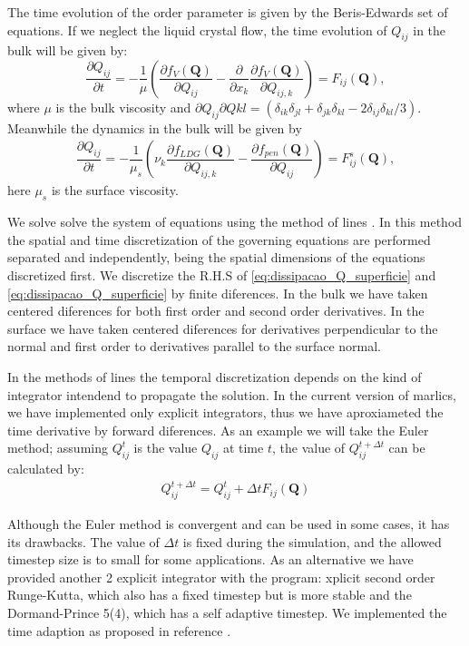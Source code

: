 \documentclass[final,5p,times,twocolumn]{elsarticle}
\begin{document}
The time evolution of the order parameter is given by the
Beris-Edwards set of equations. If we neglect the liquid crystal flow,
the time evolution of $Q_{ij}$ in the bulk will be given by:
\begin{equation} \label{eq:dissipacao_Q}
\dfrac{\partial Q_{ij}}{ \partial t} = -\dfrac{1}{\mu} \left( \dfrac{\partial f_{V}(\mathbf{Q})}{\partial Q_{ij}} - \dfrac{\partial}{\partial x_k } \dfrac{\partial f_V(\mathbf{Q})}{\partial Q_{ij,k}}  \right)=F_{ij}(\mathbf{Q}),
\end{equation}
%
where $\mu$ is the bulk viscosity and $ \partial Q_{ij} \partial Q{kl} = (\delta_{ik} \delta_{jl}+\delta_{jk} \delta_{kl}-2 \delta_{ij} \delta_{kl}/3)$. Meanwhile the dynamics in the bulk will be given by
\begin{align}\label{eq:dissipacao_Q_superficie}
\dfrac{\partial Q_{ij}}{\partial t}=-\dfrac{1}{\mu_s}\left(\nu_k\dfrac{\partial f_{LDG}(\mathbf{Q})}{\partial Q_{ij,k}} -\dfrac{\partial f_{pen}(\mathbf{Q})}{\partial Q_{ij}}\right)=F^s_{ij}(\mathbf{Q}),
\end{align}
here $\mu_s$ is the surface viscosity.

We solve solve the system of equations using the method of lines
\cite{Bhattacharjee2008}. In this method the spatial and time
discretization of the governing equations are performed separated and
independently, being the spatial dimensions of the equations
discretized first.  We discretize the R.H.S of
\eqref{eq:dissipacao_Q_superficie} and
\eqref{eq:dissipacao_Q_superficie} by finite diferences. In the bulk
we have taken centered diferences for both first order and second
order derivatives. In the surface we have taken centered diferences
for derivatives perpendicular to the normal and first order to
derivatives parallel to the surface normal.

In the methods of lines the temporal discretization depends on the
kind of integrator intendend to propagate the solution. In the current
version of marlics, we have implemented only explicit integrators,
thus we have aproxiameted the time derivative by forward diferences.
As an example we will take the Euler method; assuming $Q^t_{ij}$ is
the value $Q_{ij}$ at time $t$, the value of $Q^{t+\Delta t}_{ij}$ can
be calculated by:
\begin{align}
  Q^{t+\Delta t}_{ij}=Q^{t}_{ij}+ \Delta t F_{ij}(\mathbf{Q})
\end{align}

Although the Euler method is convergent and can be used in some cases,
it has its drawbacks. The value of $\Delta t $ is fixed during the
simulation, and the allowed timestep size is to small for some
applications. As an alternative we have provided another 2 explicit
integrator with the program: xplicit second order Runge-Kutta, which
also has a fixed timestep but is more stable and the Dormand-Prince
5(4), which has a self adaptive timestep. We implemented the time
adaption as proposed in reference \cite{hairer2008solving}.
\end{document}
